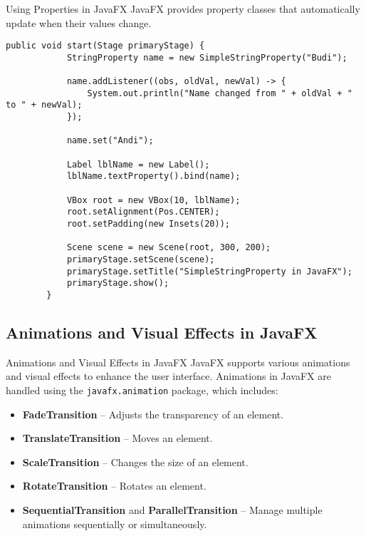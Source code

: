 \documentclass[aspectratio=169, table]{beamer}
\begin{document}
\begin{frame}[fragile]{Using Properties in JavaFX}
	\vspace{30pt}
	JavaFX provides property classes that automatically update when their values change.
	\begin{lstlisting}[style=JavaStyle]
		public void start(Stage primaryStage) {
			StringProperty name = new SimpleStringProperty("Budi");
			
			name.addListener((obs, oldVal, newVal) -> {
				System.out.println("Name changed from " + oldVal + " to " + newVal);
			});
			
			name.set("Andi");
			
			Label lblName = new Label();
			lblName.textProperty().bind(name);
			
			VBox root = new VBox(10, lblName);
			root.setAlignment(Pos.CENTER);
			root.setPadding(new Insets(20));
			
			Scene scene = new Scene(root, 300, 200);
			primaryStage.setScene(scene);
			primaryStage.setTitle("SimpleStringProperty in JavaFX");
			primaryStage.show();
		}
	\end{lstlisting}
\end{frame}

\subsection{Animations and Visual Effects in JavaFX}

\begin{frame}[fragile]{Animations and Visual Effects in JavaFX}
	\vspace{20pt}
	JavaFX supports various animations and visual effects to enhance the user interface. Animations in JavaFX are handled using the \texttt{javafx.animation} package, which includes:
	\begin{itemize}
		\item \textbf{FadeTransition} – Adjusts the transparency of an element.
		\item \textbf{TranslateTransition} – Moves an element.
		\item \textbf{ScaleTransition} – Changes the size of an element.
		\item \textbf{RotateTransition} – Rotates an element.
		\item \textbf{SequentialTransition} and \textbf{ParallelTransition} – Manage multiple animations sequentially or simultaneously.
	\end{itemize}
\end{frame}
\end{document}
